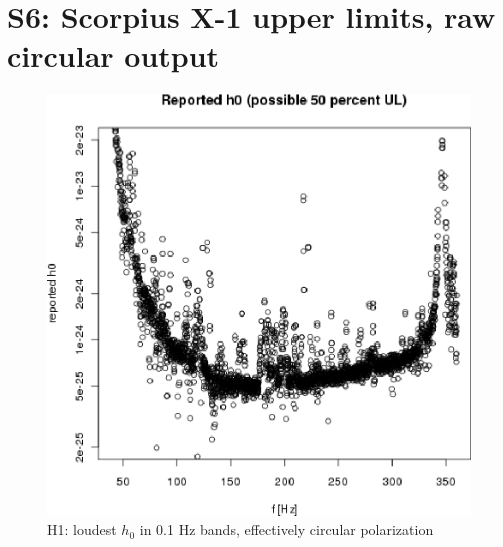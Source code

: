 \section{S6: Scorpius X-1 upper limits, raw circular output}

\begin{figure}
\begin{center}
\includegraphics[width=0.68\paperwidth,height=0.48\paperheight]{plots/h0FullUL50log-H1.eps}
\caption{
H1: loudest $h_0$ in 0.1 Hz bands, effectively circular polarization}
\label{S6_H1_raw_output_UL}
\end{center}
\end{figure}

